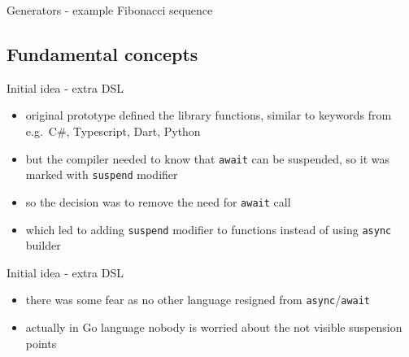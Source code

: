 \documentclass[hyperref={pdfpagelabels=false},xcolor={dvipsnames},compress,onlytextwidth]{beamer}
\begin{document}
    \begin{frame}[fragile]{Generators - example Fibonacci sequence}
        \pause
        
    \end{frame}

    \subsection{Fundamental concepts}

    \begin{frame}[fragile]{Initial idea - extra DSL}
        \pause
        \begin{itemize}
            \item original prototype defined the library functions, similar to keywords from e.g.\ C\#, Typescript, Dart, Python\pause
            \item but the compiler needed to know that \texttt{await} can be suspended, so it was marked with \texttt{suspend} modifier\pause
            \item so the decision was to remove the need for \texttt{await} call\pause
            \item which led to adding \texttt{suspend} modifier to functions instead of using \texttt{async} builder
        \end{itemize}
    \end{frame}

    \begin{frame}[fragile]{Initial idea - extra DSL}
        \begin{itemize}
            \item there was some fear as no other language resigned from \texttt{async}/\texttt{await}\pause
            \item actually in Go language nobody is worried about the not visible suspension points\pause
        \end{itemize}
        \begin{columns}
            \begin{column}{0.5\textwidth}
                \pause
            \end{column}
            \begin{column}{0.5\textwidth}
                \pause
            \end{column}
        \end{columns}
        
    \end{frame}
\end{document}

